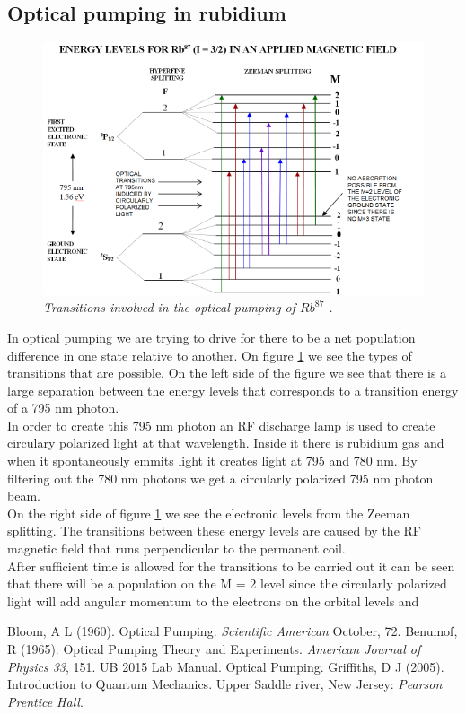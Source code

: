 \documentclass[twocolumn]{article}
\begin{document}
\subsection{Optical pumping in rubidium}
\begin{figure}
\begin{minipage}[t]{\textwidth}
\includegraphics[width=\linewidth]{pictures/energy-lev-trans.png}
\caption{\textit{Transitions involved in the optical pumping of $Rb^{87}$ 
\cite{ref:3}.}}
\label{fig:8}
\end{minipage}
\end{figure}
In optical pumping we are trying to drive for there to be a net population 
difference in one state relative to another. On figure \ref{fig:8} we see the 
types of transitions that are possible. On the left side of the figure we see 
that there is a large separation between the energy levels that corresponds to 
a transition energy of a 795 nm photon.
\\
In order to create this 795 nm photon an RF discharge lamp is used to create 
circulary polarized light at that wavelength. Inside it there is rubidium gas 
and when it spontaneously emmits light it creates light at 795 and 780 nm. 
By filtering out the 780 nm photons we get a circularly polarized 795 nm photon 
beam.
\\
On the right side of figure \ref{fig:8} we see the electronic levels from the 
Zeeman splitting. The transitions between these energy levels are caused by the 
RF magnetic field that runs perpendicular to the permanent coil.
\\
After sufficient time is allowed for the transitions to be carried out it can 
be seen that there will be a population on the M = 2 level since the circularly 
polarized light will add angular momentum to the electrons on the orbital 
levels and 

\begin{thebibliography}{9}
Bloom, A L (1960). Optical Pumping. \emph{Scientific American} October, 72.
Benumof, R (1965). Optical Pumping Theory and Experiments. \emph{American 
Journal of Physics 33}, 151.
UB 2015 Lab Manual. Optical Pumping.
Griffiths, D J (2005). Introduction to Quantum Mechanics. Upper Saddle river, 
New Jersey: \emph{Pearson Prentice Hall}.

\end{thebibliography}
\end{document}
